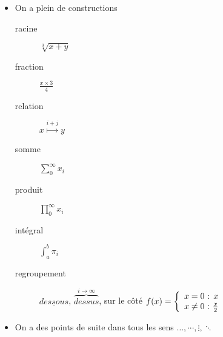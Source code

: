 \begin{frame}[allowframebreaks]
\begin{itemize}
  \item On a plein de constructions

    \begin{description}
    \item[racine] $ \sqrt[3]{x + y} $
    \item[fraction] $ \frac{x\times 3}{4} $
    \item[relation] $ x \stackrel{i+j}{\longmapsto} y $
    \item[somme] $ \sum_{0}^{\infty} x_{i} $
    \item[produit] $ \prod_{0}^{\infty} x_{i} $
    \item[intégral] $ \int_{a}^{b} \pi_{i} $
    \item[regroupement]
      $ \underline{dessous} $,
      $ \overbrace{dessus}^{i\rightarrow\infty} $,
      sur le côté
      \begin{math} %
        f(x) = \left\{
          \begin{array}{l@{~:~}r}
            x = 0 & x \\
            x \neq 0 & \frac{x}{2}
          \end{array}
        \right.
      \end{math}
    \end{description}

  \item On a des points de suite dans tous les sens $ \dots, \cdots, \vdots, \ddots $
  \end{itemize}
\end{frame}


